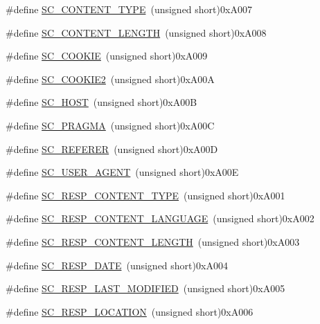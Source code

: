 \begin{DoxyCompactItemize}
\item 
\#define \hyperlink{group__AJP__defines_ga3f0d9421f5ebb00a587a50c1e6130f55}{S\+C\+\_\+\+C\+O\+N\+T\+E\+N\+T\+\_\+\+T\+Y\+PE}~(unsigned short)0x\+A007
\item 
\#define \hyperlink{group__AJP__defines_gaeda1c2020a6a9cda509c848d2643784b}{S\+C\+\_\+\+C\+O\+N\+T\+E\+N\+T\+\_\+\+L\+E\+N\+G\+TH}~(unsigned short)0x\+A008
\item 
\#define \hyperlink{group__AJP__defines_ga01257c92b2b48d2ba15c7628b9aa99ef}{S\+C\+\_\+\+C\+O\+O\+K\+IE}~(unsigned short)0x\+A009
\item 
\#define \hyperlink{group__AJP__defines_ga015ce0d9ab389cb52641e617822384e6}{S\+C\+\_\+\+C\+O\+O\+K\+I\+E2}~(unsigned short)0x\+A00A
\item 
\#define \hyperlink{group__AJP__defines_gaf2a093304a89a93b9e7f30f4603d3b0a}{S\+C\+\_\+\+H\+O\+ST}~(unsigned short)0x\+A00B
\item 
\#define \hyperlink{group__AJP__defines_ga2b9e856eb50bf93ddbee984f90d38a6a}{S\+C\+\_\+\+P\+R\+A\+G\+MA}~(unsigned short)0x\+A00C
\item 
\#define \hyperlink{group__AJP__defines_ga0dadef7b04605793aa0f1feeff98b392}{S\+C\+\_\+\+R\+E\+F\+E\+R\+ER}~(unsigned short)0x\+A00D
\item 
\#define \hyperlink{group__AJP__defines_ga55467117a8447ed121035b5f21ded199}{S\+C\+\_\+\+U\+S\+E\+R\+\_\+\+A\+G\+E\+NT}~(unsigned short)0x\+A00E
\item 
\#define \hyperlink{group__AJP__defines_gad2dc4fe67893ce1f957a9a574f56c79c}{S\+C\+\_\+\+R\+E\+S\+P\+\_\+\+C\+O\+N\+T\+E\+N\+T\+\_\+\+T\+Y\+PE}~(unsigned short)0x\+A001
\item 
\#define \hyperlink{group__AJP__defines_ga770f9562c8e3b06eef975b843eacce80}{S\+C\+\_\+\+R\+E\+S\+P\+\_\+\+C\+O\+N\+T\+E\+N\+T\+\_\+\+L\+A\+N\+G\+U\+A\+GE}~(unsigned short)0x\+A002
\item 
\#define \hyperlink{group__AJP__defines_gac6f2d478f8d3eca3507badea05b36307}{S\+C\+\_\+\+R\+E\+S\+P\+\_\+\+C\+O\+N\+T\+E\+N\+T\+\_\+\+L\+E\+N\+G\+TH}~(unsigned short)0x\+A003
\item 
\#define \hyperlink{group__AJP__defines_gac981712efceeb6d7a7cbf52f9ecddfb1}{S\+C\+\_\+\+R\+E\+S\+P\+\_\+\+D\+A\+TE}~(unsigned short)0x\+A004
\item 
\#define \hyperlink{group__AJP__defines_gaa6f7390a968a39f5f2409eb3746eff46}{S\+C\+\_\+\+R\+E\+S\+P\+\_\+\+L\+A\+S\+T\+\_\+\+M\+O\+D\+I\+F\+I\+ED}~(unsigned short)0x\+A005
\item 
\#define \hyperlink{group__AJP__defines_ga50f1dd28990c2106110a533316201d2a}{S\+C\+\_\+\+R\+E\+S\+P\+\_\+\+L\+O\+C\+A\+T\+I\+ON}~(unsigned short)0x\+A006

\end{DoxyCompactItemize}
